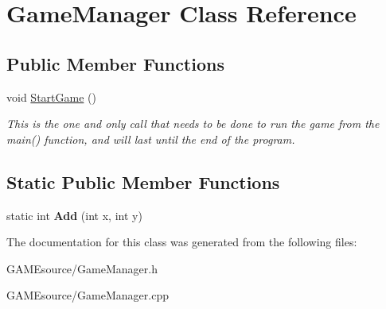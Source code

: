 \hypertarget{class_game_manager}{}\section{Game\+Manager Class Reference}
\label{class_game_manager}
\subsection*{Public Member Functions}
\begin{DoxyCompactItemize}
\item 
\mbox{\label{class_game_manager_a3af49a72977052275a1217c5018c737f}} 
void \mbox{\hyperlink{class_game_manager_a3af49a72977052275a1217c5018c737f}{Start\+Game}} ()
\begin{DoxyCompactList}\small\item\em This is the one and only call that needs to be done to run the game from the main() function, and will last until the end of the program. \end{DoxyCompactList}\end{DoxyCompactItemize}
\subsection*{Static Public Member Functions}
\begin{DoxyCompactItemize}
\item 
\mbox{\label{class_game_manager_acf7198ccac2dde4da381867356136896}} 
static int {\bfseries Add} (int x, int y)
\end{DoxyCompactItemize}


The documentation for this class was generated from the following files\+:\begin{DoxyCompactItemize}
\item 
G\+A\+M\+Esource/Game\+Manager.\+h\item 
G\+A\+M\+Esource/Game\+Manager.\+cpp\end{DoxyCompactItemize}
